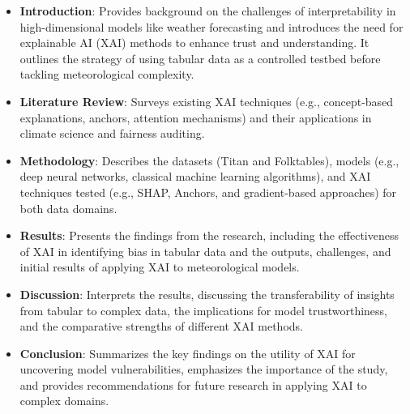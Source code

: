 \begin{itemize}
    \item \textbf{Introduction}: Provides background on the challenges of interpretability in high-dimensional models like weather forecasting and introduces the need for explainable AI (XAI) methods to enhance trust and understanding. It outlines the strategy of using tabular data as a controlled testbed before tackling meteorological complexity.
    \item \textbf{Literature Review}: Surveys existing XAI techniques (e.g., concept-based explanations, anchors, attention mechanisms) and their applications in climate science and fairness auditing.
    \item \textbf{Methodology}: Describes the datasets (Titan and Folktables), models (e.g., deep neural networks, classical machine learning algorithms), and XAI techniques tested (e.g., SHAP, Anchors, and gradient-based approaches) for both data domains.
    \item \textbf{Results}: Presents the findings from the research, including the effectiveness of XAI in identifying bias in tabular data and the outputs, challenges, and initial results of applying XAI to meteorological models.
    \item \textbf{Discussion}: Interprets the results, discussing the transferability of insights from tabular to complex data, the implications for model trustworthiness, and the comparative strengths of different XAI methods.
    \item \textbf{Conclusion}: Summarizes the key findings on the utility of XAI for uncovering model vulnerabilities, emphasizes the importance of the study, and provides recommendations for future research in applying XAI to complex domains.
\end{itemize}